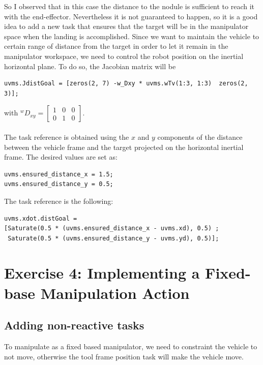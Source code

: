 \documentclass{article}
\begin{document}
\begin{figure}[H]
	\centering
	\hspace{10mm}
	\label{im:v_land_grasp}
\end{figure} 
So I observed that in this case the distance to the nodule is sufficient to reach it with the end-effector. Nevertheless it is not guaranteed to happen, so it is a good idea to add a new task that ensures that the target will be in the manipulator space when the landing is accomplished.
Since we want to maintain the vehicle to certain range of distance from the target in order to let it remain in the manipulator workspace, we need to control the robot position on the inertial horizontal plane. To do so, the Jacobian matrix will be
\begin{lstlisting}
uvms.JdistGoal = [zeros(2, 7) -w_Dxy * uvms.wTv(1:3, 1:3)  zeros(2, 3)];
\end{lstlisting}
with \(^wD_{xy} = \begin{bmatrix} 1 & 0 & 0 \\	0 & 1 & 0 \end{bmatrix}\).\\\\
The task reference is obtained using the \(x\) and \(y\) components of the distance between the vehicle frame and the target projected on the horizontal inertial frame.
The desired values are set as: 
\begin{lstlisting}
uvms.ensured_distance_x = 1.5;
uvms.ensured_distance_y = 0.5;
\end{lstlisting}
The task reference is the following: 
\begin{lstlisting}
uvms.xdot.distGoal = 
[Saturate(0.5 * (uvms.ensured_distance_x - uvms.xd), 0.5) ;
 Saturate(0.5 * (uvms.ensured_distance_y - uvms.yd), 0.5)];
\end{lstlisting}
\clearpage

\section{Exercise 4: Implementing a Fixed-base Manipulation Action}
\subsection{Adding non-reactive tasks}
To manipulate as a fixed based manipulator, we need to constraint the vehicle to not move, otherwise the tool frame position task will make the vehicle move.
\end{document}

